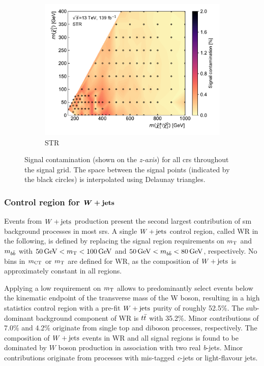 \begin{figure}
\begin{subfigure}[b]{0.5\linewidth}
		\centering\includegraphics[width=1.0\textwidth]{signal_contamination/plot_STR}
		\caption{STR\label{fig:signal_contaminations_STCR}}
	\end{subfigure}\hfill

	\caption{Signal contamination (shown on the \textit{z-axis}) for all \glspl{cr} throughout the signal grid. The space between the signal points (indicated by the black circles) is interpolated using Delaunay triangles.}
	\label{fig:signal_contamination_CR}
\end{figure}

\subsubsection[Control region for $\wjets$]{Control region for $\makemebold{\wjets}$}

Events from $\wjets$ production present the second largest contribution of \gls{sm} background processes in most \glspl{sr}.
A single $\wjets$ control region, called WR in the following, is defined by replacing the signal region requirements on $m_{\textrm{T}}$ and $m_{b\bar{b}}$ with $\SI{50}{\GeV} < \mt < \SI{100}{\GeV}$  and $\SI{50}{\GeV} < \mbb < \SI{80}{\GeV}$, respectively.
No bins in $m_{\textrm{CT}}$ or $m_{\textrm{T}}$ are defined for WR, as the composition of $\wjets$ is approximately constant in all regions.

Applying a low requirement on $m_{\textrm{T}}$ allows to predominantly select events below the kinematic endpoint of the transverse mass of the W boson, resulting in a high statistics control region with a pre-fit $\wjets$ purity of roughly 52.5\%.
The sub-dominant background component of WR is $t\bar{t}$ with 35.2\%.
Minor contributions of 7.0\% and 4.2\% originate from single top and diboson processes, respectively.
The composition of $\wjets$ events in WR and all signal regions is found to be dominated by $W$ boson production in association with two real \textit{b}-jets.
Minor contributions originate from processes with mis-tagged \textit{c}-jets or light-flavour jets.

